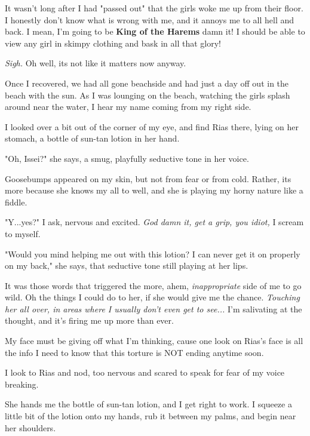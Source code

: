 \documentclass{article}
\begin{document}
It wasn't long after I had "passed out" that the girls woke me up from their floor. I honestly don't know what is wrong with me, and it annoys me to all hell and back. I mean, I'm going to be \textbf{King of the Harems} damn it! I should be able to view any girl in skimpy clothing and bask in all that glory!

\emph{Sigh.} Oh well, its not like it matters now anyway.

Once I recovered, we had all gone beachside and had just a day off out in the beach with the sun. As I was lounging on the beach, watching the girls splash around near the water, I hear my name coming from my right side.

I looked over a bit out of the corner of my eye, and find Rias there, lying on her stomach, a bottle of sun-tan lotion in her hand.

"Oh, Issei?" she says, a smug, playfully seductive tone in her voice.

Goosebumps appeared on my skin, but not from fear or from cold. Rather, its more because she knows my all to well, and she is playing my horny nature like a fiddle.
 
"Y...yes?" I ask, nervous and excited. \emph{God damn it, get a grip, you idiot,} I scream to myself.

"Would you mind helping me out with this lotion? I can never get it on properly on my back," she says, that seductive tone still playing at her lips.

It was those words that triggered the more, ahem, \emph{inappropriate} side of me to go wild. Oh the things I could do to her, if she would give me the chance. \emph{Touching her all over, in areas where I usually don't even get to see...} I'm salivating at the thought, and it's firing me up more than ever.

My face must be giving off what I'm thinking, cause one look on Rias's face is all the info I need to know that this torture is NOT ending anytime soon.

I look to Rias and nod, too nervous and scared to speak for fear of my voice breaking. 

She hands me the bottle of sun-tan lotion, and I get right to work. I squeeze a little bit of the lotion onto my hands, rub it between my palms, and begin near her shoulders. 
\end{document}
